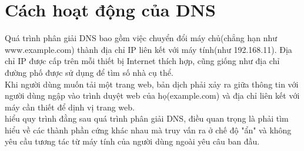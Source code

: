 \documentclass{article}
\begin{document}
\section{Cách hoạt động của DNS}
Quá trình phân giải DNS bao gồm việc chuyển đổi máy chủ(chẳng hạn như www.example.com) thành địa chỉ IP liên kết với máy tính(như 192.168.11). Địa chỉ IP được cấp trên mỗi thiết bị Internet thích hợp, cũng giống như địa chỉ đường phố được sử dụng để tìm số nhà cụ thể.\\

\noindent Khi người dùng muốn tải một trang web, bản dịch phải xảy ra giữa thông tin với người dùng ngập vào trình duyệt web của họ(example.com) và địa chỉ liên kết với máy cần thiết để dịnh vị trang web.\\

 hiểu quy trình đằng sau quá trình phân giải DNS, điều quan trọng là phải tìm hiểu về các thành phần cứng khác nhau mà truy vấn ra ở chế độ "ẩn" và không yêu cầu tương tác từ máy tính của người dùng ngoài yêu câu ban đầu.\\
\end{document}
